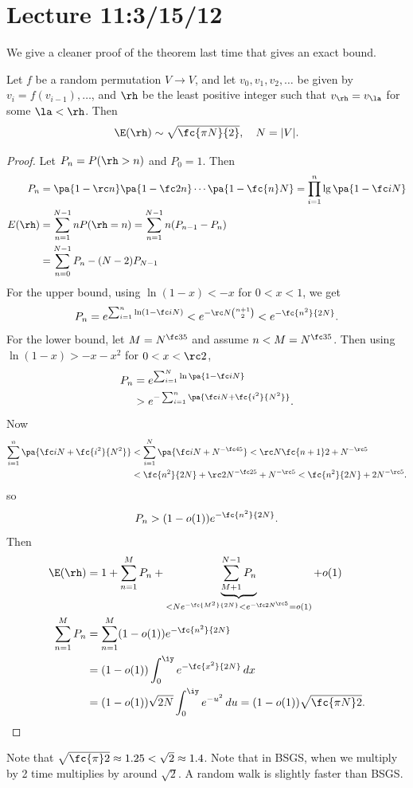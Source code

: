 \section{Lecture 11:3/15/12}
We give a cleaner proof of the theorem last time that gives an exact bound.
\begin{thm}
Let $f$ be a random permutation $V\to V$, and let $v_0,v_1,v_2,\ldots$ be given by $v_i=f(v_{i-1}),\ldots$, and $\rh$ be the least positive integer such that $v_{\rh}=v_{\la}$ for some $\la<\rh$. Then
\[
\E(\rh)\sim \sqrt{\fc{\pi N}{2}},\quad N=|V|.
\]
\end{thm}
\begin{proof}
Let $P_n=P(\rh>n)$ and $P_0=1$. Then
\begin{align*}
P_n&=\pa{1-\rc n}\pa{1-\fc2 n}\cdots \pa{1-\fc{n}N}
=\prod_{i=1}^{n} \lg\pa{1-\fc iN}\\
E(\rh)&=\sum_{n=1}^{N-1}nP(\rh=n) = \sum_{n=1}^{N-1} n(P_{n-1}-P_n)\\
&=\sum_{n=0}^{N-1} P_n-(N-2)P_{N-1}
\end{align*}
For the upper bound, using $\ln(1-x)<-x$ for $0<x<1$, we get
\[
P_n=e^{\sum_{i=1}^n\ln (1-\fc iN)}<e^{-\rc N\binom{n+1}2}<e^{-\fc{n^2}{2N}}.\]%
For the lower bound, let $M=N^{\fc 35}$ and assume $n<M=N^{\fc 35}$. Then using $\ln(1-x)>-x-x^2$ for $0<x<\rc 2$,
\begin{align*}
P_n&=e^{\sum_{i=1}^N \ln\pa{1-\fc iN}}\\
&>e^{-\sum_{i=1}^n \pa{\fc iN+\fc{i^2}{N^2}}}.
\end{align*}
Now
\begin{align*}
\sum_{i=1}^n \pa{
\fc iN +\fc{i^2}{N^2}
}
&<
\sum_{i=1}^N \pa{
\fc iN+N^{-\fc 45}
}
<
\rc N \fc{n+1}2+N^{-\rc 5}\\
&<\fc{n^2}{2N}+\rc 2 N^{-\fc 25}+N^{-\rc 5} <\fc{n^2}{2N}+2N^{-\rc 5}.
\end{align*}
so
\[
P_n>(1-o(1))e^{-\fc{n^2}{2N}}.
\]
Then
\begin{align*}
\E(\rh)
&=1+\sum_{n=1}^M P_n + \underbrace{\sum_{M+1}^{N-1} P_n}_{<Ne^{-\fc{M^2}{2N}}<e^{-\fc 2N^{\rc 5}}=o(1)} + o(1)\\
\sum_{n=1}^M P_n &= \sum_{n=1}^M (1-o(1)) e^{-\fc{n^2}{2N}}\\
&=(1-o(1))\int_0^{\iy} e^{-\fc{x^2}{2N}}\,dx\\
&=(1-o(1))\sqrt{2N} \int_0^{\iy} e^{-u^2}\,du=(1-o(1))\sqrt{\fc{\pi N}2}.
\end{align*}
\end{proof}
Note that $\sqrt{\fc{\pi}2}\approx 1.25<\sqrt 2\approx 1.4$. Note that in BSGS, when we multiply by 2 time multiplies by around $\sqrt2$. 
A random walk is slightly faster than BSGS.

